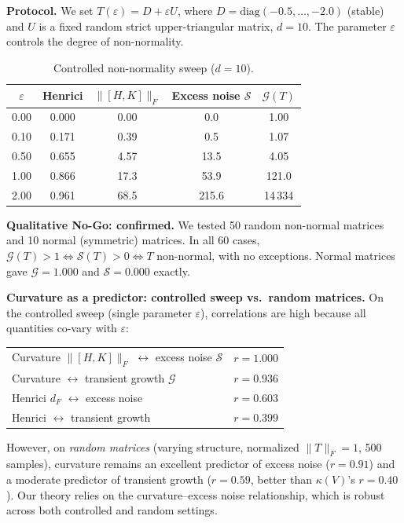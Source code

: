 \documentclass[11pt,a4paper]{article}
\theoremstyle{definition}
\begin{document}
\textbf{Protocol.} We set $T(\varepsilon) = D + \varepsilon U$, where
$D = \mathrm{diag}(-0.5, \ldots, -2.0)$ (stable) and $U$ is a fixed
random strict upper-triangular matrix, $d = 10$.
The parameter $\varepsilon$ controls the degree of non-normality.

\begin{table}[h]
\centering
\caption{Controlled non-normality sweep ($d = 10$).}
\label{tab:nogo}
\begin{tabular}{@{}ccccc@{}}
\toprule
$\varepsilon$ & Henrici & $\|[H,K]\|_F$ & Excess noise $\mathcal{S}$ & $\mathcal{G}(T)$ \\
\midrule
0.00 & 0.000 & 0.00 & 0.0 & 1.00 \\
0.10 & 0.171 & 0.39 & 0.5 & 1.07 \\
0.50 & 0.655 & 4.57 & 13.5 & 4.05 \\
1.00 & 0.866 & 17.3 & 53.9 & 121.0 \\
2.00 & 0.961 & 68.5 & 215.6 & 14\,334 \\
\bottomrule
\end{tabular}
\end{table}

\textbf{Qualitative No-Go: confirmed.}
We tested 50 random non-normal matrices and 10 normal (symmetric) matrices.
In all 60 cases, $\mathcal{G}(T) > 1 \Leftrightarrow \mathcal{S}(T) > 0
\Leftrightarrow T$ non-normal, with no exceptions. Normal matrices gave
$\mathcal{G} = 1.000$ and $\mathcal{S} = 0.000$ exactly.

\textbf{Curvature as a predictor: controlled sweep vs.\ random matrices.}
On the controlled sweep (single parameter $\varepsilon$), correlations
are high because all quantities co-vary with $\varepsilon$:
\begin{center}
\begin{tabular}{lc}
Curvature $\|[H,K]\|_F$ \; $\leftrightarrow$ \; excess noise $\mathcal{S}$ & $r = 1.000$ \\
Curvature \; $\leftrightarrow$ \; transient growth $\mathcal{G}$ & $r = 0.936$ \\
Henrici $d_F$ \; $\leftrightarrow$ \; excess noise & $r = 0.603$ \\
Henrici \; $\leftrightarrow$ \; transient growth & $r = 0.399$ \\
\end{tabular}
\end{center}
However, on \emph{random matrices} (varying structure, normalized
$\|T\|_F = 1$, 500 samples), curvature remains an excellent
predictor of excess noise ($r = 0.91$) and a moderate predictor
of transient growth ($r = 0.59$, better than $\kappa(V)$'s
$r = 0.40$). Our theory relies on the curvature--excess noise
relationship, which is robust across both controlled and random
settings.
\end{document}
